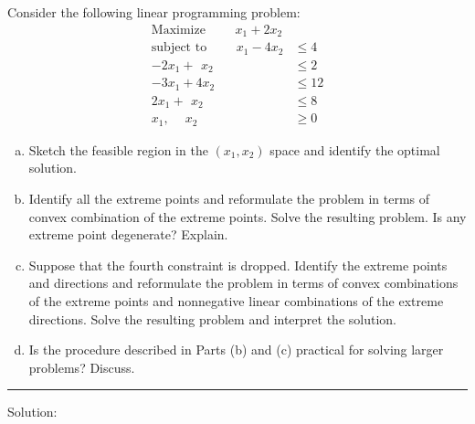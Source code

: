 \documentclass[12pt]{amsart}
\begin{document}
\subsection{}
Consider the following linear programming problem:
\begin{align*}
	\text{Maximize }\qquad  x_1 + 2x_2 & \\
	\text{subject to }\qquad x_1 - 4x_2 &\leq 4 \\
 	-2x_1 +\,\ x_2 &\leq 2  \\ 
 	-3x_1 +   4x_2 &\leq 12 \\
	 2x_1 +\,\ x_2 &\leq 8  \\
	  x_1,\quad\   x_2 &\geq 0	  
\end{align*}

\begin{enumerate}[a.]
	\item 
	Sketch the feasible region in the \((x_1,x_2)\) space and identify the optimal solution.
	\item 
	Identify all the extreme points and reformulate the problem in terms of convex combination of the extreme points. 
	Solve the resulting problem. 
	Is any extreme point degenerate? Explain.
	\item 
	Suppose that the fourth constraint is dropped. Identify the extreme points and directions and reformulate the problem in terms of convex combinations of the extreme points and nonnegative linear combinations of the extreme directions. Solve the resulting problem and interpret the solution.
	\item 
	Is the procedure described in Parts (b) and (c) practical for solving larger problems? Discuss.
\end{enumerate}

\medskip \hrule \medskip
Solution:
\end{document}
